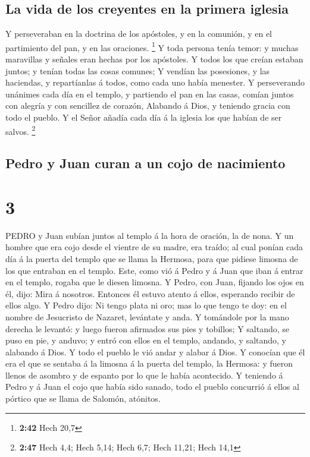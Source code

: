 \hypertarget{la-vida-de-los-creyentes-en-la-primera-iglesia}{%
\subsection{La vida de los creyentes en la primera
iglesia}\label{la-vida-de-los-creyentes-en-la-primera-iglesia}}

 Y perseveraban en la doctrina de los apóstoles, y en la
comunión, y en el partimiento del pan, y en las oraciones. \footnote{\textbf{2:42}
  Hech 20,7}  Y toda persona tenía temor: y muchas
maravillas y señales eran hechas por los apóstoles.  Y
todos los que creían estaban juntos; y tenían todas las cosas comunes;
 Y vendían las posesiones, y las haciendas, y repartíanlas
á todos, como cada uno había menester.  Y perseverando
unánimes cada día en el templo, y partiendo el pan en las casas, comían
juntos con alegría y con sencillez de corazón,  Alabando á
Dios, y teniendo gracia con todo el pueblo. Y el Señor añadía cada día á
la iglesia los que habían de ser salvos. \footnote{\textbf{2:47} Hech
  4,4; Hech 5,14; Hech 6,7; Hech 11,21; Hech 14,1}

\hypertarget{pedro-y-juan-curan-a-un-cojo-de-nacimiento}{%
\subsection{Pedro y Juan curan a un cojo de
nacimiento}\label{pedro-y-juan-curan-a-un-cojo-de-nacimiento}}

\hypertarget{section-2}{%
\section{3}\label{section-2}}

 PEDRO y Juan subían juntos al templo á la hora de oración,
la de nona.  Y un hombre que era cojo desde el vientre de su
madre, era traído; al cual ponían cada día á la puerta del templo que se
llama la Hermosa, para que pidiese limosna de los que entraban en el
templo.  Este, como vió á Pedro y á Juan que iban á entrar
en el templo, rogaba que le diesen limosna.  Y Pedro, con
Juan, fijando los ojos en él, dijo: Mira á nosotros. 
Entonces él estuvo atento á ellos, esperando recibir de ellos algo.
 Y Pedro dijo: Ni tengo plata ni oro; mas lo que tengo te
doy: en el nombre de Jesucristo de Nazaret, levántate y anda.
 Y tomándole por la mano derecha le levantó: y luego fueron
afirmados sus pies y tobillos;  Y saltando, se puso en pie,
y anduvo; y entró con ellos en el templo, andando, y saltando, y
alabando á Dios.  Y todo el pueblo le vió andar y alabar á
Dios.  Y conocían que él era el que se sentaba á la limosna
á la puerta del templo, la Hermosa: y fueron llenos de asombro y de
espanto por lo que le había acontecido.  Y teniendo á Pedro
y á Juan el cojo que había sido sanado, todo el pueblo concurrió á ellos
al pórtico que se llama de Salomón, atónitos.

